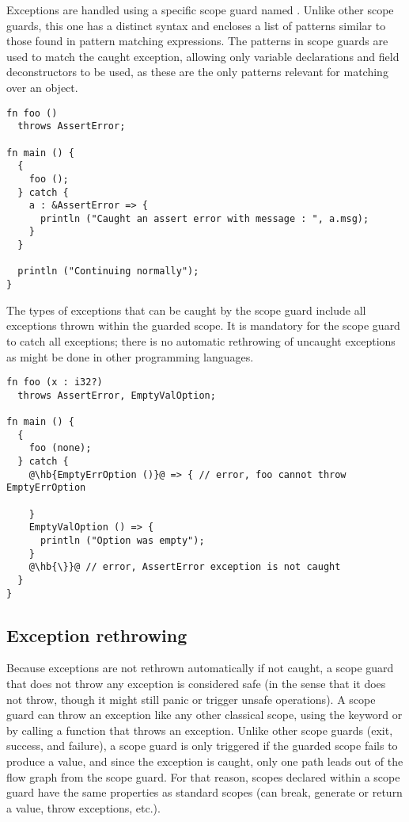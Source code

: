 Exceptions are handled using a specific scope guard named . Unlike
other scope guards, this one has a distinct syntax and encloses a list of
patterns similar to those found in pattern matching expressions. The patterns in
 scope guards are used to match the caught exception, allowing only
variable declarations and field deconstructors to be used, as these are the only
patterns relevant for matching over an object.


\begin{lstlisting}[style=coloredverbatim]
fn foo ()
  throws AssertError;

fn main () {
  {
    foo ();
  } catch {
    a : &AssertError => {
      println ("Caught an assert error with message : ", a.msg);
    }
  }

  println ("Continuing normally");
}
\end{lstlisting}

The types of exceptions that can be caught by the  scope guard
include all exceptions thrown within the guarded scope. It is mandatory for the
scope guard to catch all exceptions; there is no automatic rethrowing of
uncaught exceptions as might be done in other programming languages.

\begin{lstlisting}[style=coloredverbatim, escapechar=@]
fn foo (x : i32?)
  throws AssertError, EmptyValOption;

fn main () {
  {
    foo (none);
  } catch {
    @\hb{EmptyErrOption ()}@ => { // error, foo cannot throw EmptyErrOption

    }
    EmptyValOption () => {
      println ("Option was empty");
    }
    @\hb{\}}@ // error, AssertError exception is not caught
  }
}
\end{lstlisting}

\subsection{Exception rethrowing}

Because exceptions are not rethrown automatically if not caught, a 
scope guard that does not throw any exception is considered safe (in the sense
that it does not throw, though it might still panic or trigger unsafe
operations). A  scope guard can throw an exception like any other
classical scope, using the keyword  or by calling a function that
throws an exception. Unlike other scope guards (exit, success, and failure), a
 scope guard is only triggered if the guarded scope fails to
produce a value, and since the exception is caught, only one path leads out of
the flow graph from the scope guard. For that reason, scopes declared within a
 scope guard have the same properties as standard scopes (can
break, generate or return a value, throw exceptions, etc.).



